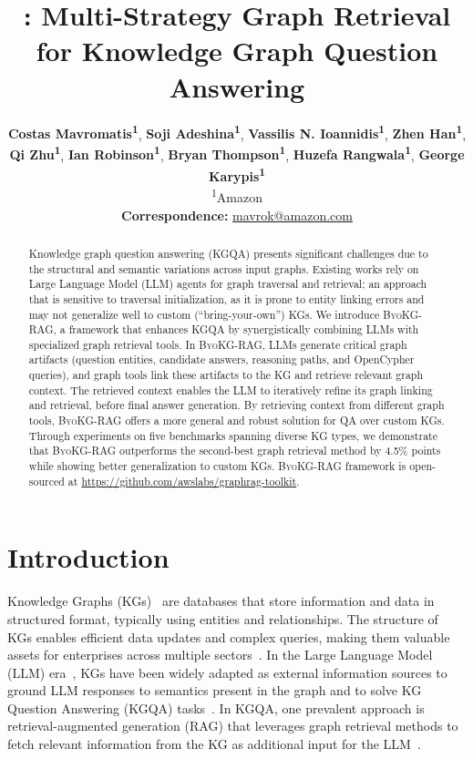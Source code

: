 \documentclass[11pt]{article}
\title{
\byokg: Multi-Strategy Graph Retrieval for Knowledge Graph Question Answering}
\author{
 \textbf{Costas Mavromatis\textsuperscript{1}},
 \textbf{Soji Adeshina\textsuperscript{1}},
 \textbf{Vassilis N. Ioannidis\textsuperscript{1}},
 \textbf{Zhen Han\textsuperscript{1}},
\\
 \textbf{Qi Zhu\textsuperscript{1}},
 \textbf{Ian Robinson\textsuperscript{1}},
 \textbf{Bryan Thompson\textsuperscript{1}},
 \textbf{Huzefa Rangwala\textsuperscript{1}},
 \textbf{George Karypis\textsuperscript{1}}
\\
 \textsuperscript{1}Amazon
\\
 \small{
   \textbf{Correspondence:} \href{mailto:email@domain}{mavrok@amazon.com}
 }
}
\newcommand{\byokg}{\textsc{ByoKG-RAG}\xspace}
\begin{document}
\maketitle
\begin{abstract}
Knowledge graph question answering (KGQA) presents significant challenges due to the structural and semantic variations across input graphs. Existing works rely on Large Language Model (LLM) agents for graph traversal and retrieval; an approach that is sensitive to traversal initialization, as it is prone to entity linking errors and may not generalize well to custom (``bring-your-own'') KGs. We introduce \byokg, a framework that enhances KGQA by synergistically combining LLMs with specialized graph retrieval tools. In \byokg, LLMs generate critical graph artifacts (question entities, candidate answers, reasoning paths, and OpenCypher queries), and graph tools link these artifacts to the KG and retrieve relevant graph context. The retrieved context enables the LLM to iteratively refine its graph linking and retrieval, before final answer generation.
 By retrieving context from different graph tools, \byokg offers a more general and robust solution for QA over custom KGs.
 Through experiments on five benchmarks spanning diverse KG types, we demonstrate that \byokg outperforms the second-best graph retrieval method by 4.5\% points while showing better generalization to custom KGs. \byokg framework is open-sourced at \url{https://github.com/awslabs/graphrag-toolkit}.
 



\end{abstract}

\section{Introduction}







Knowledge Graphs (KGs)~\citep{vrandevcic2014wikidata} are databases that store information and data in structured format, typically using entities and relationships. The structure of KGs enables efficient data updates and complex queries, making them valuable assets for enterprises across multiple sectors~\citep{ozsoy2024text2cypher}. In the Large Language Model (LLM) era~\citep{brown2020language,bommasani2021opportunities}, KGs have been widely adapted as external information sources to ground LLM responses to semantics present in the graph and to solve KG Question Answering (KGQA) tasks~\citep{pan2024unifying}. 
In  KGQA,  one prevalent approach is retrieval-augmented generation (RAG) that leverages graph retrieval methods to fetch relevant information from the KG as additional input for the LLM~\citep{lewis2020retrieval,peng2024graph}.
\end{document}
